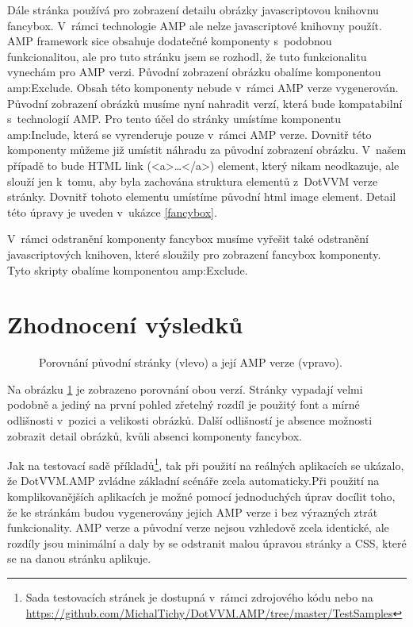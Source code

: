 Dále stránka používá pro zobrazení detailu obrázky javascriptovou knihovnu fancybox. V~rámci technologie AMP ale nelze javascriptové knihovny použít. AMP framework sice obsahuje dodatečné komponenty s~podobnou funkcionalitou, ale pro tuto stránku jsem se rozhodl, že tuto funkcionalitu vynechám pro AMP verzi. Původní zobrazení obrázku obalíme komponentou amp:Exclude. Obsah této komponenty nebude v~rámci AMP verze vygenerován. Původní zobrazení obrázků musíme nyní nahradit verzí, která bude kompatabilní s~technologií AMP. Pro tento účel do stránky umístíme komponentu amp:Include, která se vyrenderuje pouze v~rámci AMP verze. Dovnitř této komponenty můžeme již umístit náhradu za původní zobrazení obrázku. V~našem případě to bude HTML link (<a>\ldots</a>) element, který nikam neodkazuje, ale slouží jen k~tomu, aby byla zachována struktura elementů z~DotVVM verze stránky. Dovnitř tohoto elementu umístíme původní html image element. Detail této úpravy je uveden v~ukázce \ref{fancybox}.

V~rámci odstranění komponenty fancybox musíme vyřešit také odstranění javascriptových knihoven, které sloužily pro zobrazení fancybox komponenty. Tyto skripty obalíme komponentou amp:Exclude.




\section{Zhodnocení výsledků}

\begin{figure}[hbt]
\hspace{-20px}
	\caption{Porovnání původní stránky (vlevo) a její AMP verze (vpravo).}
	\label{originalVSamp}
\end{figure}

Na obrázku \ref{originalVSamp} je zobrazeno porovnání obou verzí. Stránky vypadají velmi podobně a jediný na první pohled zřetelný rozdíl je použitý font a mírné odlišnosti v~pozici a velikosti obrázků. Další odlišností je absence možnosti zobrazit detail obrázků, kvůli absenci komponenty fancybox.

Jak na testovací sadě příkladů\footnote{ Sada testovacích stránek je dostupná v~rámci zdrojového kódu nebo na \url{https://github.com/MichalTichy/DotVVM.AMP/tree/master/TestSamples}}, tak při použití na reálných aplikacích se ukázalo, že DotVVM.AMP zvládne základní scénáře zcela automaticky.Při použití na komplikovanějších aplikacích je možné pomocí jednoduchých úprav docílit toho, že ke stránkám budou vygenerovány jejich AMP verze i bez výrazných ztrát funkcionality. AMP verze a původní verze nejsou vzhledově zcela identické, ale rozdíly jsou minimální a daly by se odstranit malou úpravou stránky a CSS, které se na danou stránku aplikuje.

